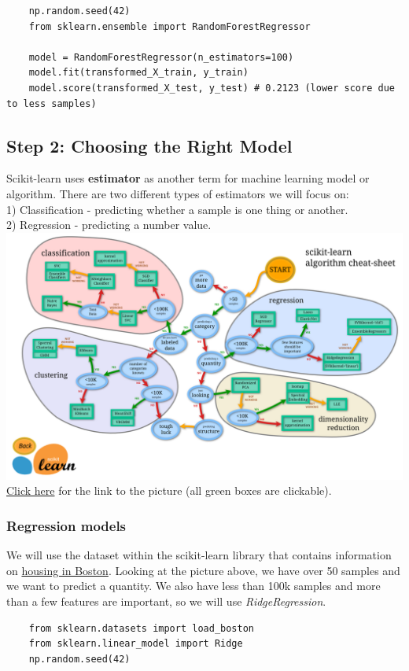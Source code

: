 \documentclass[11pt, a4paper]{article}
\begin{document}
\begin{spacing}{1.1}
\begin{lstlisting}
	np.random.seed(42)
	from sklearn.ensemble import RandomForestRegressor
	
	model = RandomForestRegressor(n_estimators=100)
	model.fit(transformed_X_train, y_train)
	model.score(transformed_X_test, y_test) # 0.2123 (lower score due to less samples) \end{lstlisting} \vspace*{1mm}
	
	\subsection{Step 2: Choosing the Right Model}
	Scikit-learn uses \textbf{estimator} as another term for machine learning model or algorithm. There are two different types of estimators we will focus on: \\
	\hspace*{2mm} 1) Classification - predicting whether a sample is one thing or another. \\
	\hspace*{2mm} 2) Regression - predicting a number value. \\
	\includegraphics[scale=.11]{est} \\
	\href{https://scikit-learn.org/stable/tutorial/machine_learning_map/index.html}{Click here} for the link to the picture (all green boxes are clickable). \newpage

	\subsubsection{Regression models}
	We will use the dataset within the scikit-learn library that contains information on \href{https://scikit-learn.org/stable/datasets/index.html}{housing in Boston}. Looking at the picture above, we have over 50 samples and we want to predict a quantity. We also have less than 100k samples and more than a few features are important, so we will use \textit{RidgeRegression}. 
	\begin{lstlisting}
	from sklearn.datasets import load_boston
	from sklearn.linear_model import Ridge
	np.random.seed(42)
	

\end{lstlisting}
\end{spacing}
\end{document}
